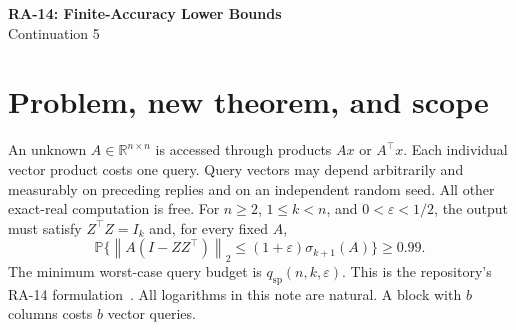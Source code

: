 \documentclass[11pt]{article}
\numberwithin{equation}{section}
\theoremstyle{remark}\newtheorem{remark}[theorem]{Remark}
\newcommand{\R}{\mathbb R}
\newcommand{\Prob}{\mathbb P}
\newcommand{\eps}{\varepsilon}
\newcommand{\qsp}{q_{\mathrm{sp}}}
\newcommand{\norm}[1]{\left\lVert #1\right\rVert}
\begin{document}
\begin{center}
{\LARGE\bfseries RA-14: Finite-Accuracy Lower Bounds}\\[5pt]
{\large Continuation 5}
\end{center}
\begin{abstract}
For every admissible finite dimension, rank, and accuracy, this note gives a proof of
\[
q_{\mathrm{sp}}(n,k,\eps)\ \ge\ c\,\frac{k}{\sqrt\eps}
\log\!\left(1+\frac{n\sqrt\eps}{k}\right)
\]
with a universal positive constant. The argument uses a determinant tilt of a singular Wishart law, its exact posterior under adaptive matrix--vector queries, and an integration-by-parts estimate on a Grassmann manifold. For $k\le n/8$, during the first $n/4$ queries, a regularized log-determinant of the hidden-kernel overlap increases by at most $4\nu/n$ in conditional expectation per query. The finite-dimensional spectral input is the least-singular-value theorem of Rudelson--Vershynin, with its hypotheses retained; no deformed-Wigner dimension restriction is used.

Together with the preceding upper bound, this proves $\Theta(\sqrt n\log n)$ at $k=1$, $\eps=1/n$, and $\Theta(n)$ whenever $\eps\le(k/n)^2$. It also gives matching universal-constant bounds throughout $\eps\ge k/n$. A logarithmic transition remains: at $k=1$, $\eps=(\log n/n)^2$, the bounds here are $\Omega(n\log\log n/\log n)$ and $O(n)$.

The full RA-14 problem is therefore still \textbf{PARTIAL}. The new lower-bound proof and its exact remaining gap are written out below. This is an unreviewed mathematical research argument, not an independently certified or proof-assistant-verified result.
\end{abstract}
\setcounter{tocdepth}{1}
\begingroup
\small
\setlength{\parskip}{0pt}
\tableofcontents
\endgroup
\newpage

\section{Problem, new theorem, and scope}\label{sec:main}
An unknown $A\in\R^{n\times n}$ is accessed through products $Ax$ or $A^\top x$. Each individual vector product costs one query. Query vectors may depend arbitrarily and measurably on preceding replies and on an independent random seed. All other exact-real computation is free. For $n\ge2$, $1\le k<n$, and $0<\eps<1/2$, the output must satisfy $Z^\top Z=I_k$ and, for every fixed $A$,
\begin{equation}\label{eq:target}
\Prob\{\norm{A(I-ZZ^\top)}_2\le(1+\eps)\sigma_{k+1}(A)\}\ge0.99.
\end{equation}
The minimum worst-case query budget is $\qsp(n,k,\eps)$. This is the repository's RA-14 formulation~\cite{repo}. All logarithms in this note are natural. A block with $b$ columns costs $b$ vector queries.
\end{document}
